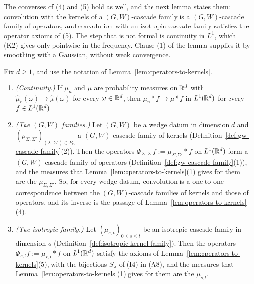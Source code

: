 The converses of (4) and (5) hold as well, and the next lemma states them: convolution
with the kernels of a $(G, W)$-cascade family is a $(G, W)$-cascade family of operators, and
convolution with an isotropic cascade family satisfies the operator axioms of (5). The step
that is not formal is continuity in $L^1$, which (K2) gives only pointwise in the frequency.
Clause (1) of the lemma supplies it by smoothing with a Gaussian, without weak convergence.

\begin{lemma}\label{lem:kernels-to-operators}
Fix $d \ge 1$, and use the notation of Lemma~\ref{lem:operators-to-kernels}.
\begin{enumerate}
\item \emph{(Continuity.)} If $\mu_n$ and $\mu$ are probability measures on $\mathbb{R}^d$ with
$\widehat\mu_n(\omega) \to \widehat\mu(\omega)$ for every $\omega \in \mathbb{R}^d$, then
$\mu_n * f \to \mu * f$ in $L^1(\mathbb{R}^d)$ for every $f \in L^1(\mathbb{R}^d)$.
\item \emph{(The $(G, W)$ families.)} Let $(G, W)$ be a wedge datum in dimension $d$ and
$(\mu_{\Sigma,\Sigma'})_{(\Sigma,\Sigma') \in P_W}$ a $(G, W)$-cascade family of kernels
(Definition~\ref{def:gw-cascade-family}(2)). Then the operators $\Phi_{\Sigma,\Sigma'}f := \mu_{\Sigma,\Sigma'} * f$
on $L^1(\mathbb{R}^d)$ form a $(G, W)$-cascade family of operators (Definition~\ref{def:gw-cascade-family}(1)), and the
measures that Lemma~\ref{lem:operators-to-kernels}(1) gives for them are the $\mu_{\Sigma,\Sigma'}$. So, for
every wedge datum, convolution is a one-to-one correspondence between the $(G, W)$-cascade families of
kernels and those of operators, and its inverse is the passage of
Lemma~\ref{lem:operators-to-kernels}(4).
\item \emph{(The isotropic family.)} Let $(\mu_{s,t})_{0 \le s \le t}$ be an isotropic cascade family
in dimension $d$ (Definition~\ref{def:isotropic-kernel-family}). Then the operators $\Phi_{s,t}f := \mu_{s,t} * f$
on $L^1(\mathbb{R}^d)$ satisfy the axioms of Lemma~\ref{lem:operators-to-kernels}(5), with the bijections
$S_\lambda$ of (I4) in (A8), and the measures that Lemma~\ref{lem:operators-to-kernels}(1) gives for them are
the $\mu_{s,t}$.
\end{enumerate}
\end{lemma}

